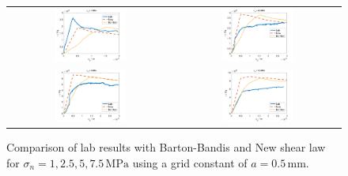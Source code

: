 \begin{figure}[!ht]
\begin{center}
\begin{tabular}{c c}
\includegraphics[width=0.45\textwidth]{./figures/MEX7_New-vs-Lab-vs-BB1.png} &
\includegraphics[width=0.45\textwidth]{./figures/MEX7_New-vs-Lab-vs-BB2.png} \\
\includegraphics[width=0.45\textwidth]{./figures/MEX7_New-vs-Lab-vs-BB3.png} &
\includegraphics[width=0.45\textwidth]{./figures/MEX7_New-vs-Lab-vs-BB4.png}\\
\end{tabular}
\end{center}
\caption{Comparison of lab results with Barton-Bandis and New shear law for $\sigma_n=1,2.5,5,7.5\,\text{MPa}$ using a grid constant of $a=0.5\,\text{mm}$.}
\label{fig:MEX7_New-Lab-BB}
\end{figure}


